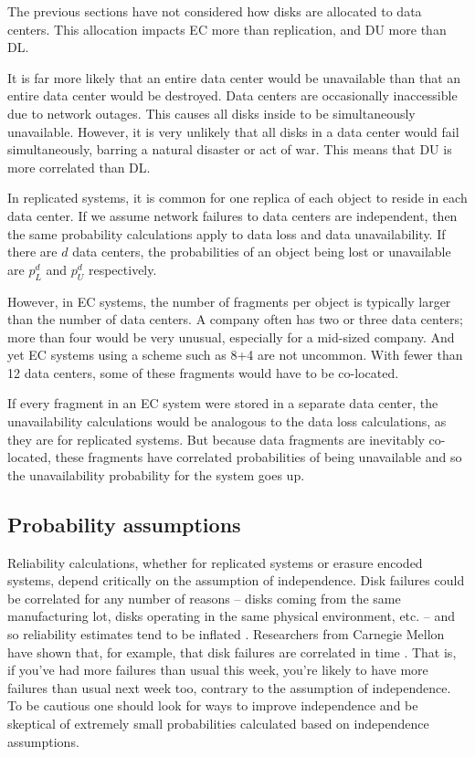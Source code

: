 \documentclass[11pt]{article}
\begin{document}
The previous sections have not considered how disks are allocated to data centers. This allocation impacts EC more than replication, and DU more than DL.

It is far more likely that an entire data center would be unavailable than that an entire data center would be destroyed. Data centers are occasionally inaccessible due to network outages. This causes all disks inside to be simultaneously unavailable. However, it is very unlikely that all disks in a data center would fail simultaneously, barring a natural disaster or act of war. This means that DU is more correlated than DL.

In replicated systems, it is common for one replica of each object to reside in each data center. If we assume network failures to data centers are independent, then the same probability calculations apply to data loss and data unavailability. If there are $d$ data centers, the probabilities of an object being lost or unavailable are $p_L^d$ and $p_U^d$ respectively.

However, in EC systems, the number of fragments per object is typically larger than the number of data centers. A company often has two or three data centers; more than four would be very unusual, especially for a mid-sized company. And yet EC systems using a scheme such as 8+4 are not uncommon. With fewer than 12 data centers, some of these fragments would have to be co-located.

If every fragment in an EC system were stored in a separate data center, the unavailability calculations would be analogous to the data loss calculations, as they are for replicated systems. But because data fragments are inevitably co-located, these fragments have correlated probabilities of being unavailable and so the unavailability probability for the system goes up. 

\subsection{Probability assumptions}

Reliability calculations, whether for replicated systems or erasure encoded systems, depend critically on the assumption of independence. Disk failures could be correlated for any number of reasons -- disks coming from the same manufacturing lot, disks operating in the same physical environment, etc. -- and so reliability estimates tend to be inflated \cite{goog}. Researchers from Carnegie Mellon have shown that, for example, that disk failures are correlated in time \cite{cmu}. That is, if you've had more failures than usual this week, you're likely to have more failures than usual next week too, contrary to the assumption of independence. To be cautious one should look for ways to improve independence and be skeptical of extremely small probabilities calculated based on independence assumptions. 
\end{document}
